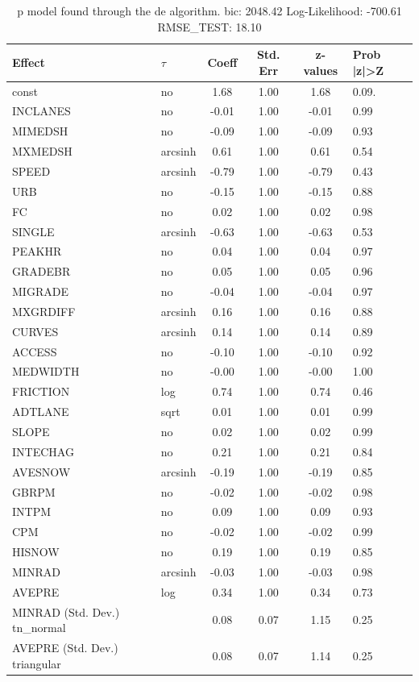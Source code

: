 \begin{table}
	\caption{p model found through the de algorithm. bic: 2048.42 Log-Likelihood: -700.61 RMSE_TEST: 18.10}
	\begin{center}
		\begin{tabular}{|l|l|c|c|c|l|}
			\hline
			Effect & $\tau$ & Coeff & Std. Err & z-values & Prob |z|>Z \\
			\hline
			const & no & 1.68 & 1.00 & 1.68 & 0.09. \\
			\hline
			INCLANES & no & -0.01 & 1.00 & -0.01 & 0.99 \\
			\hline
			MIMEDSH & no & -0.09 & 1.00 & -0.09 & 0.93 \\
			\hline
			MXMEDSH & arcsinh & 0.61 & 1.00 & 0.61 & 0.54 \\
			\hline
			SPEED & arcsinh & -0.79 & 1.00 & -0.79 & 0.43 \\
			\hline
			URB & no & -0.15 & 1.00 & -0.15 & 0.88 \\
			\hline
			FC & no & 0.02 & 1.00 & 0.02 & 0.98 \\
			\hline
			SINGLE & arcsinh & -0.63 & 1.00 & -0.63 & 0.53 \\
			\hline
			PEAKHR & no & 0.04 & 1.00 & 0.04 & 0.97 \\
			\hline
			GRADEBR & no & 0.05 & 1.00 & 0.05 & 0.96 \\
			\hline
			MIGRADE & no & -0.04 & 1.00 & -0.04 & 0.97 \\
			\hline
			MXGRDIFF & arcsinh & 0.16 & 1.00 & 0.16 & 0.88 \\
			\hline
			CURVES & arcsinh & 0.14 & 1.00 & 0.14 & 0.89 \\
			\hline
			ACCESS & no & -0.10 & 1.00 & -0.10 & 0.92 \\
			\hline
			MEDWIDTH & no & -0.00 & 1.00 & -0.00 & 1.00 \\
			\hline
			FRICTION & log & 0.74 & 1.00 & 0.74 & 0.46 \\
			\hline
			ADTLANE & sqrt & 0.01 & 1.00 & 0.01 & 0.99 \\
			\hline
			SLOPE & no & 0.02 & 1.00 & 0.02 & 0.99 \\
			\hline
			INTECHAG & no & 0.21 & 1.00 & 0.21 & 0.84 \\
			\hline
			AVESNOW & arcsinh & -0.19 & 1.00 & -0.19 & 0.85 \\
			\hline
			GBRPM & no & -0.02 & 1.00 & -0.02 & 0.98 \\
			\hline
			INTPM & no & 0.09 & 1.00 & 0.09 & 0.93 \\
			\hline
			CPM & no & -0.02 & 1.00 & -0.02 & 0.99 \\
			\hline
			HISNOW & no & 0.19 & 1.00 & 0.19 & 0.85 \\
			\hline
			MINRAD & arcsinh & -0.03 & 1.00 & -0.03 & 0.98 \\
			\hline
			AVEPRE & log & 0.34 & 1.00 & 0.34 & 0.73 \\
			\hline
			MINRAD (Std. Dev.) tn_normal &  & 0.08 & 0.07 & 1.15 & 0.25 \\
			\hline
			AVEPRE (Std. Dev.) triangular &  & 0.08 & 0.07 & 1.14 & 0.25 \\
			\hline
		\end{tabular}
	\end{center}
\end{table}